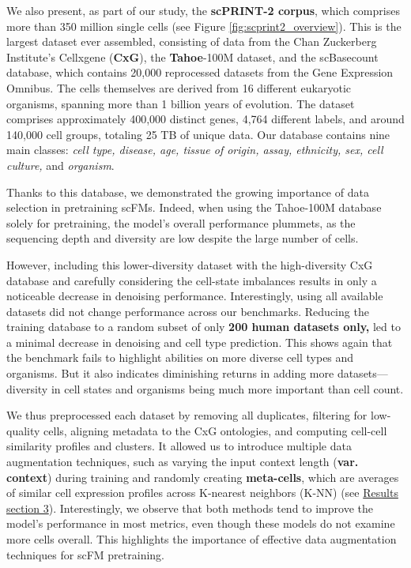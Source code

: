 We also present, as part of our study, the \textbf{\gls{scPRINT}-2 corpus},
which comprises more than 350 million single cells (see Figure \ref{fig:scprint2_overview}). This
is the largest dataset ever assembled, consisting of data from the Chan
Zuckerberg Institute's Cellxgene (\textbf{CxG}), the \textbf{Tahoe}-100M
dataset, and the scBasecount database, which contains 20,000 reprocessed
datasets from the Gene Expression Omnibus\citep{programCZCELLxGENEDiscover2023,youngblutScBaseCount2025,zhangTahoe100M2025}. The
cells themselves are derived from 16 different eukaryotic organisms,
spanning more than 1 billion years of evolution. The dataset comprises
approximately 400,000 distinct genes, 4,764 different labels, and around
140,000 cell groups, totaling 25 TB of unique data\citep{jeremiekalfonTrainingFoundationModels}.
Our database contains nine main classes: \emph{cell type, disease, age,
tissue of origin, assay, ethnicity, sex, cell culture,} and
\emph{organism}.

Thanks to this database, we demonstrated the growing importance of data
selection in pretraining \gls{scFM}s. Indeed, when using the Tahoe-100M
database solely for pretraining, the model's overall performance
plummets, as the sequencing depth and diversity are low despite the
large number of cells.

However, including this lower-diversity dataset with the high-diversity
CxG database and carefully considering the cell-state imbalances results
in only a noticeable decrease in denoising performance. Interestingly,
using all available datasets did not change performance across our
benchmarks. Reducing the training database to a random subset of only
\textbf{200 human datasets only,} led to a minimal decrease in denoising
and cell type prediction. This shows again that the benchmark fails to
highlight abilities on more diverse cell types and
organisms\citep{maloneModelingSampleVariables2010,wolfSCANPYLargescaleSinglecell2018}. But it also indicates diminishing
returns in adding more datasets---diversity in cell states and organisms
being much more important than cell count.

We thus preprocessed each dataset by removing all duplicates, filtering
for low-quality cells, aligning metadata to the CxG ontologies, and
computing cell-cell similarity profiles and clusters. It allowed us to
introduce multiple data augmentation techniques, such as varying the
input context length (\textbf{var. context}) during training and
randomly creating \textbf{meta-cells}, which are averages of similar
cell expression profiles across K-nearest neighbors (K-NN) (see
\hyperref[a-multi-cell-denoising-auto-encoder-task-unlocks-new-modalities-and-performances]{Results
section 3}). Interestingly, we observe that both methods tend to
improve the model's performance in most metrics, even though these
models do not examine more cells overall. This highlights the importance
of effective data augmentation techniques for scFM
pretraining\citep{comprehensiveSurveyDataAugmentation2024}.

